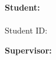 \begin{titlepage}
{    \vspace{1.5cm}

    \vspace{50pt}

    \begin{minipage}[t]{0.45\textwidth}
    \raggedright
    \textbf{Student:}\\
    \studentName\\
    Student ID: \studentID
    \end{minipage}
    \hspace{1cm}
    \begin{minipage}[t]{0.45\textwidth}
    \raggedleft
    \textbf{Supervisor:}\\
    \supervisorName\\
    \end{minipage}

    \vfill
    { \completionDate}
}
\end{titlepage}
